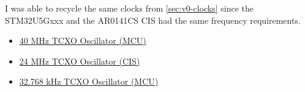 I was able to recycle the same clocks from \autoref{sec:v0-clocks} since the STM32U5Gxxx and the AR0141CS CIS had the same frequency requirements.

\begin{itemize}
    \item \href{https://www.mouser.com/ProductDetail/ECS/ECS-TXO-2016-33-400-TR?qs=PzGy0jfpSMtctR53CPxRHg%3D%3D}{40 MHz TCXO Oscillator (MCU)}
    \item \href{https://www.mouser.com/ProductDetail/ECS/ECS-TXO-3225MV-240-TR?qs=d0WKAl%252BL4KYXn7UuwSFJGQ%3D%3D}{24 MHz TCXO Oscillator (CIS)}
    \item \href{https://www.mouser.com/ProductDetail/ECS/ECS-327TXO-2012-33-TR?qs=amGC7iS6iy%252Bnhf6zW2Y7hQ%3D%3D}{32.768 kHz TCXO Oscillator (MCU)}
\end{itemize}